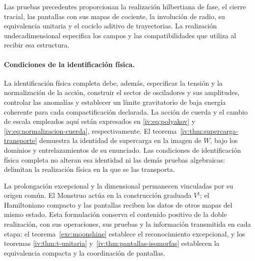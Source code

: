 Las pruebas precedentes proporcionan la realización
hilbertiana de fase, el cierre tracial, las pantallas
con sus mapas de cociente, la involución de radio,
su equivalencia unitaria y el cociclo aditivo de
trayectorias. La realización undecadimensional
especifica los campos y las compatibilidades que
utiliza al recibir esa estructura.

\paragraph{Condiciones de la identificación física.}
\label{iv:condiciones-realizacion-fisica}
La identificación física completa debe, además,
especificar la tensión y la normalización de la acción,
construir el sector de osciladores y sus amplitudes,
controlar las anomalías y establecer un límite
gravitatorio de baja energía coherente para cada
compactificación declarada.
La acción de cuerda y el cambio de escala empleados
aquí están expresados en \eqref{iv:eq:polyakov}
y \eqref{iv:eq:normalizacion-cuerda}, respectivamente.
El teorema~\ref{iv:thm:supercarga-transporte}
demuestra la identidad de supercarga en la imagen de
\(W\), bajo los dominios y entrelazamientos de su
enunciado. Las condiciones de identificación física
completa no alteran esa identidad ni las demás
pruebas algebraicas: delimitan la realización física
en la que se las transporta.

La prolongación excepcional y la dimensional
permanecen vinculadas por su origen común. El
Monstruo actúa en la construcción graduada
\(V^\natural\); el Hamiltoniano compacto y las
pantallas reciben los datos de otros mapas del
mismo estado. Esta formulación conserva el
contenido positivo de la doble realización,
con sus operaciones, sus pruebas y la información
transmitida en cada etapa: el teorema~\ref{exc:moonshine}
establece el reconocimiento excepcional, y los teoremas
\ref{iv:thm:t-unitaria} y~\ref{iv:thm:pantallas-isomorfas}
establecen la equivalencia compacta y la coordinación de pantallas.
